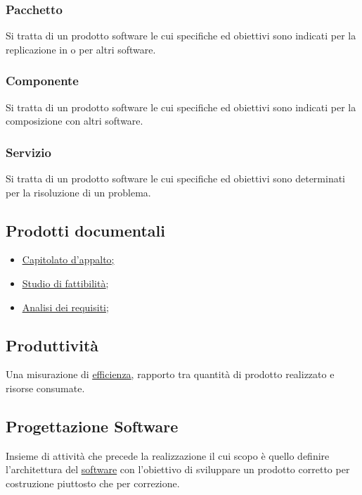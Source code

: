 		\subsubsection{Pacchetto}
		Si tratta di un prodotto software le cui specifiche ed obiettivi sono indicati per la replicazione in o per altri software.

		\subsubsection{Componente}
		Si tratta di un prodotto software le cui specifiche ed obiettivi sono indicati per la composizione con altri software.

		\subsubsection{Servizio}
		Si tratta di un prodotto software le cui specifiche ed obiettivi sono determinati per la risoluzione di un problema.

	\subsection{Prodotti documentali}
	\label{sec:prodottidocumentali}
	\begin{itemize}
	\item \underline{\hyperref[sec:capitolato]{Capitolato d'appalto};}
	\item \underline{\hyperref[sec:studiofattibilita]{Studio di fattibilità}};
	\item \underline{\hyperref[sec:analisirequisiti]{Analisi dei requisiti}};
	\end{itemize}

	\subsection{Produttività}
	\label{sec:produttivita}
	Una misurazione di \underline{\hyperref[sec:efficienza]{efficienza}}, rapporto tra quantità di prodotto realizzato e risorse consumate.

	\subsection{Progettazione Software}
	\label{sec:progettazionesoftware}
	Insieme di attività che precede la realizzazione il cui scopo è quello definire l'architettura del \underline{\hyperref[sec:prodottosoftware]{software}} con l'obiettivo di sviluppare un prodotto corretto per costruzione piuttosto che per correzione.

